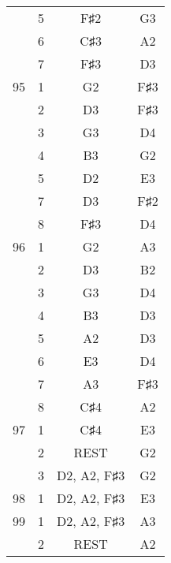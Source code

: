 \documentclass{article}
\begin{document}
\begin{longtable}{|c|c|c|c|}
  & 5 & F♯2 & G3 \\ 
  & 6 & C♯3 & A2 \\ 
  & 7 & F♯3 & D3 \\ 
\hline
95 & 1 & G2 & F♯3 \\ 
  & 2 & D3 & F♯3 \\ 
  & 3 & G3 & D4 \\ 
  & 4 & B3 & G2 \\ 
  & 5 & D2 & E3 \\ 
  & 7 & D3 & F♯2 \\ 
  & 8 & F♯3 & D4 \\ 
\hline
96 & 1 & G2 & A3 \\ 
  & 2 & D3 & B2 \\ 
  & 3 & G3 & D4 \\ 
  & 4 & B3 & D3 \\ 
  & 5 & A2 & D3 \\ 
  & 6 & E3 & D4 \\ 
  & 7 & A3 & F♯3 \\ 
  & 8 & C♯4 & A2 \\ 
\hline
97 & 1 & C♯4 & E3 \\ 
  & 2 & REST & G2 \\ 
  & 3 & D2, A2, F♯3 & G2 \\ 
\hline
98 & 1 & D2, A2, F♯3 & E3 \\ 
\hline
99 & 1 & D2, A2, F♯3 & A3 \\ 
  & 2 & REST & A2 \\ 
\hline
\end{longtable}
\end{document}
